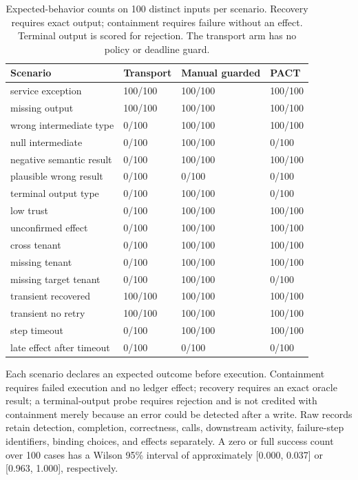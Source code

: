 \documentclass[10pt,twocolumn,a4paper]{article}
\begin{document}
\begin{table}[t]
\centering
\caption{Expected-behavior counts on 100 distinct inputs per scenario. Recovery requires exact output; containment requires failure without an effect. Terminal output is scored for rejection. The transport arm has no policy or deadline guard.}
\label{tab:faults-extended}
\small
\setlength{\tabcolsep}{4pt}
\renewcommand{\arraystretch}{1.12}
\begin{tabularx}{\textwidth}{@{}Xlll@{}}
\toprule
Scenario & Transport & Manual guarded & PACT\\
\midrule
service exception & 100/100 & 100/100 & 100/100\\
missing output & 100/100 & 100/100 & 100/100\\
wrong intermediate type & 0/100 & 100/100 & 100/100\\
null intermediate & 0/100 & 100/100 & 0/100\\
negative semantic result & 0/100 & 100/100 & 100/100\\
plausible wrong result & 0/100 & 0/100 & 0/100\\
terminal output type & 0/100 & 100/100 & 0/100\\
low trust & 0/100 & 100/100 & 100/100\\
unconfirmed effect & 0/100 & 100/100 & 100/100\\
cross tenant & 0/100 & 100/100 & 100/100\\
missing tenant & 0/100 & 100/100 & 100/100\\
missing target tenant & 0/100 & 100/100 & 0/100\\
transient recovered & 100/100 & 100/100 & 100/100\\
transient no retry & 100/100 & 100/100 & 100/100\\
step timeout & 0/100 & 100/100 & 100/100\\
late effect after timeout & 0/100 & 0/100 & 0/100\\
\bottomrule
\end{tabularx}
\end{table}
Each scenario declares an expected outcome before execution. Containment requires failed execution and no ledger effect; recovery requires an exact oracle result; a terminal-output probe requires rejection and is not credited with containment merely because an error could be detected after a write. Raw records retain detection, completion, correctness, calls, downstream activity, failure-step identifiers, binding choices, and effects separately. A zero or full success count over 100 cases has a Wilson 95\% interval of approximately [0.000, 0.037] or [0.963, 1.000], respectively.
\end{document}
